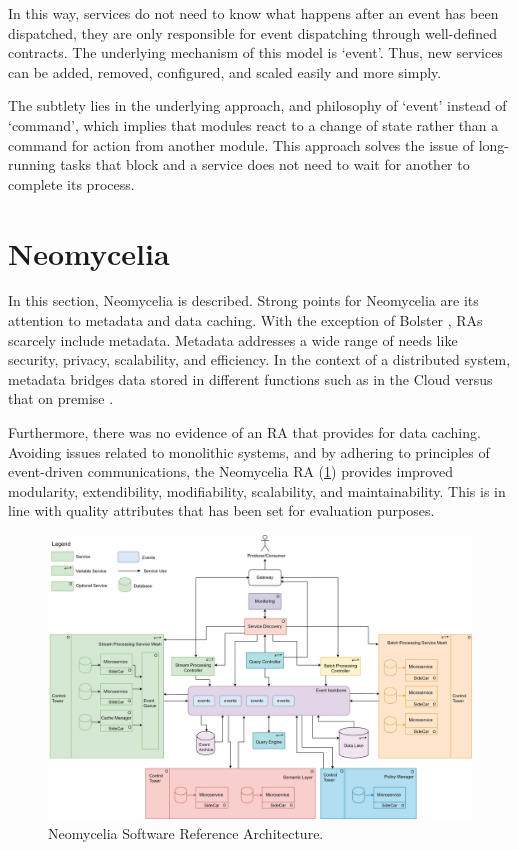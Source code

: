 \documentclass[runningheads]{llncs}
\begin{document}
In this way, services do not need to know what happens after an event has been dispatched, they are only responsible for event dispatching through well-defined contracts. The underlying mechanism of this model is ‘event’. Thus, new services can be added, removed, configured, and scaled easily and more simply.

The subtlety lies in the underlying approach, and philosophy of ‘event’ instead of ‘command’, which implies that modules react to a change of state rather than a command for action from another module. This approach solves the issue of long-running tasks that block and a service does not need to wait for another to complete its process.


\section{Neomycelia}
In this section, Neomycelia is described. Strong points for Neomycelia are its attention to metadata and data caching. With the exception of Bolster \cite{Nadal}, RAs scarcely include metadata. Metadata addresses a wide range of needs like security, privacy, scalability, and efficiency. In the context of  a distributed system, metadata bridges data stored in different functions such as in the Cloud versus that on premise \cite{Eichler}.

Furthermore, there was no evidence of an RA that provides for data caching. Avoiding issues related to monolithic systems, and by adhering to principles of event-driven communications, the Neomycelia RA (\ref{NeomyceliaFig}) provides improved modularity, extendibility, modifiability, scalability, and maintainability. This is in line with quality attributes that has been set for evaluation purposes.


\begin{figure}
    \includegraphics[width=\textwidth]{Neomycelia.eps}
    \caption{Neomycelia Software Reference Architecture.} \label{NeomyceliaFig}
\end{figure}
\end{document}
